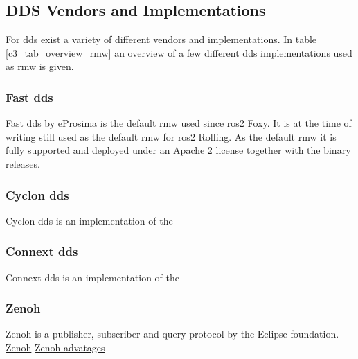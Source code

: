 \subsection{DDS Vendors and Implementations}
For \gls{dds} exist a variety of different vendors and implementations. In table \ref{c3_tab_overview_rmw} an overview of a few different \gls{dds} implementations used as \gls{rmw} is given.
\subsubsection*{Fast \gls{dds}}
Fast \gls{dds} by eProsima is the default \gls{rmw} used since \gls{ros2} Foxy. It is at the time of writing still used as the default \gls{rmw} for \gls{ros2} Rolling. As the default \gls{rmw} it is fully supported and deployed under an Apache 2 license together with the binary releases. 
\subsubsection*{Cyclon \gls{dds}}
Cyclon \gls{dds} is an implementation of the 
\subsubsection*{Connext \gls{dds}}
Connext \gls{dds} is an implementation of the 
\subsubsection*{Zenoh}
Zenoh is a publisher, subscriber and query protocol by the Eclipse foundation.
\href{https://www.adlinktech.com/en/Zenoh}{Zenoh} 
\href{https://zenoh.io/blog/2021-03-23-discovery/}{Zenoh advatages} 

